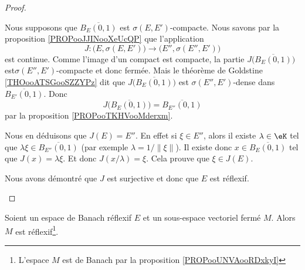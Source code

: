 \begin{proof}
\begin{subproof}
		\spitem[\( \Leftarrow\)]
		Nous supposons que \( \overline{B_E(0,1)}\) est \( \sigma(E,E')\)-compacte. Nous savons par la proposition \ref{PROPooJJINooXeUcQP} que l'application
		\begin{equation}
			J \colon \big( E,\sigma(E,E') \big)\to \big( E'',\sigma(E'',E') \big)
		\end{equation}
		est continue. Comme l'image d'un compact est compacte, la partie \( J\big( \overline{B_E(0,1)} \big)\) est\( \sigma(E'',E')\)-compacte et donc fermée. Mais le théorème de Goldstine \ref{THOooATSGooSZZYPz} dit que \( J\big( \overline{B_E(0,1)} \big)\) est \( \sigma(E'',E')\)-dense dans \( \overline{B_{E'}(0,1)}\). Donc
		\begin{equation}
			J\big( \overline{B_E(0,1)} \big)=\overline{B_{E''}(0,1)}
		\end{equation}
		par la proposition \ref{PROPooTKHVooMderxm}.

		Nous en déduisons que \( J(E)=E''\). En effet si \( \xi\in E''\), alors il existe \( \lambda\in \eK\) tel que \( \lambda \xi\in\overline{B_{E''}(0,1)}\) (par exemple \( \lambda=1/\| \xi \|\)). Il existe donc \( x\in \overline{B_E(0,1)}\) tel que \( J(x)=\lambda\xi\). Et donc \( J(x/\lambda)=\xi\). Cela prouve que \( \xi\in J(E)\).

		Nous avons démontré que \( J\) est surjective et donc que \( E\) est réflexif.
	\end{subproof}
\end{proof}


\begin{proposition}	\label{PROPooRNORooDjGqWy}
	Soient un espace de Banach réflexif \( E\) et un sous-espace vectoriel fermé \( M\). Alors \( M\) est réflexif\footnote{L'espace \( M\) est de Banach par la proposition \ref{PROPooUNVAooRDxkyI}}.
\end{proposition}

